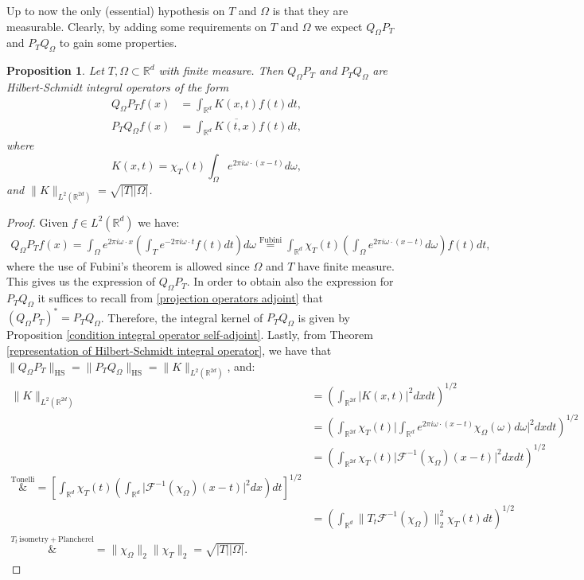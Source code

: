 \documentclass[corpo=11pt, stile=classica, tipotesi=custom,
greek, evenboxes, english]{toptesi}
\numberwithin{equation}{chapter}
\newtheorem{prop}[teo]{Proposition}
\theoremstyle{definition}
\theoremstyle{remark}
\newcommand{\R}{\mathbb{R}} %
\newcommand{\F}{\mathscr{F}} %
\begin{document}
Up to now the only (essential) hypothesis on $T$ and $\Omega$ is that they are measurable. Clearly, by adding some requirements on $T$ and $\Omega$ we expect $Q_{\Omega} P_T$ and $P_T Q_{\Omega}$ to gain some properties.
\begin{prop}\label{projection operators are Hilbert-Schmidt}
	Let $T,\Omega \subset \R^d$ with finite measure. Then $Q_{\Omega} P_T$ and $P_T Q_{\Omega}$ are Hilbert-Schmidt integral operators of the form
	\begin{align}
		Q_{\Omega} P_T f(x) &= \int_{\R^d} K(x,t) f(t) dt, \\
		P_T Q_{\Omega} f(x) &= \int_{\R^d} \overline{K(t,x)}f(t)dt,
	\end{align}
	where
	\begin{equation}\label{integral kernel projection operators}
		K(x,t) = \chi_T(t) \int_{\Omega} e^{2 \pi i \omega \cdot (x-t)}d\omega,
	\end{equation}
	and $\| K \|_{L^2(\R^{2d})} = \sqrt{|T||\Omega|}$.
\end{prop}
\begin{proof}
	Given $f \in L^2(\R^d)$ we have:
	\begin{align*}
		Q_{\Omega}P_T f(x) = \int_{\Omega} e^{2 \pi i \omega \cdot x} \left(\int_{T} e^{-2\pi i \omega \cdot t} f(t)dt\right)d\omega \overset{\mathrm{Fubini}}{=} \int_{\R^d} \chi_T(t) \left(\int_{\Omega} e^{2 \pi i \omega \cdot (x -t)} d\omega\right)f(t)dt,
	\end{align*}
	where the use of Fubini's theorem is allowed since $\Omega$ and $T$ have finite measure. This gives us the expression of $Q_{\Omega}P_T$. In order to obtain also the expression for $P_T Q_{\Omega}$ it suffices to recall from \eqref{projection operators adjoint} that $(Q_{\Omega} P_T)^* = P_T Q_{\Omega}$. Therefore, the integral kernel of $P_T Q_{\Omega}$ is given by Proposition \ref{condition integral operator self-adjoint}. Lastly, from Theorem \ref{representation of Hilbert-Schmidt integral operator}, we have that $\|Q_{\Omega} P_T\|_{\mathrm{HS}} = \|P_T Q_{\Omega}\|_{\mathrm{HS}} = \|K\|_{L^2(\R^{2d})}$, and:
	\begin{align*}
		\|K\|_{L^2(\R^{2d})} &= \left(\int_{\R^{2d}}   |K(x,t)|^2 dxdt\right)^{1/2} \\
							 &= \left(\int_{\R^{2d}} \chi_T(t) \Bigg| \int_{\R^d} e^{2 \pi i \omega \cdot (x-t)} \chi_{\Omega}(\omega)d\omega \Bigg|^2 dxdt \right)^{1/2} \\
							 &= \left(\int_{\R^{2d}} \chi_T(t) \big|\F^{-1}(\chi_{\Omega})(x-t)\big|^2dxdt\right)^{1/2}  \\
							 \overset{\mathrm{Tonelli}}&{=} \left[ \int_{\R^d} \chi_T(t) \left(\int_{\R^d} \big|\F^{-1}(\chi_{\Omega})(x-t)\big|^2 dx\right)dt\right]^{1/2} \\
							 &= \left(\int_{\R^d} \| T_t \F^{-1} (\chi_{\Omega})\|_2^2 \chi_T(t)dt\right)^{1/2} \\
							 \overset{T_t\,\mathrm{isometry} + \mathrm{Plancherel}}&{=} \| \chi_{\Omega} \|_2 \|\chi_T\|_2 = \sqrt{|T| |\Omega|}.
	\end{align*}
\end{proof}
\end{document}
